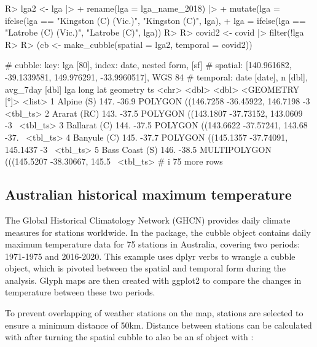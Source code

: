 \documentclass[
  shortnames]{jss}
\begin{document}
\begin{CodeChunk}
\begin{CodeInput}
R> lga2 <- lga |>
+   rename(lga = lga_name_2018) |> 
+   mutate(lga = ifelse(lga == "Kingston (C) (Vic.)", "Kingston (C)", lga),
+          lga = ifelse(lga == "Latrobe (C) (Vic.)", "Latrobe (C)", lga))
R>   
R> covid2 <- covid |> filter(!lga %
R> 
R> (cb <- make_cubble(spatial = lga2, temporal = covid2))
\end{CodeInput}
\begin{CodeOutput}
# cubble:   key: lga [80], index: date, nested form, [sf]
# spatial:  [140.961682, -39.1339581, 149.976291, -33.9960517], WGS 84
# temporal: date [date], n [dbl], avg_7day [dbl]
  lga             long   lat                                   geometry ts      
  <chr>          <dbl> <dbl>                             <GEOMETRY [°]> <list>  
1 Alpine (S)      147. -36.9 POLYGON ((146.7258 -36.45922, 146.7198 -3~ <tbl_ts>
2 Ararat (RC)     143. -37.5 POLYGON ((143.1807 -37.73152, 143.0609 -3~ <tbl_ts>
3 Ballarat (C)    144. -37.5 POLYGON ((143.6622 -37.57241, 143.68 -37.~ <tbl_ts>
4 Banyule (C)     145. -37.7 POLYGON ((145.1357 -37.74091, 145.1437 -3~ <tbl_ts>
5 Bass Coast (S)  146. -38.5 MULTIPOLYGON (((145.5207 -38.30667, 145.5~ <tbl_ts>
# i 75 more rows
\end{CodeOutput}
\end{CodeChunk}

\hypertarget{historicaltmax}{%
\subsection{Australian historical maximum temperature}\label{historicaltmax}}

The Global Historical Climatology Network (GHCN) provides daily climate measures for stations worldwide. In the  package, the cubble object  contains daily maximum temperature data for 75 stations in Australia, covering two periods: 1971-1975 and 2016-2020. This example uses dplyr verbs to wrangle a cubble object, which is pivoted between the spatial and temporal form during the analysis. Glyph maps are then created with ggplot2 to compare the changes in temperature between these two periods.

To prevent overlapping of weather stations on the map, stations are selected to ensure a minimum distance of 50km. Distance between stations can be calculated with  after turning the spatial cubble to also be an sf object with :
\end{document}
